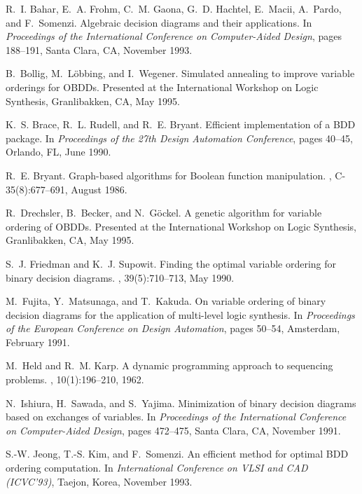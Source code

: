 \documentclass[11pt]{article}
\begin{document}
\begin{thebibliography}{10}

R.~I. Bahar, E.~A. Frohm, C.~M. Gaona, G.~D. Hachtel, E.~Macii, A.~Pardo, and
  F.~Somenzi.
\newblock Algebraic decision diagrams and their applications.
\newblock In {\em Proceedings of the International Conference on Computer-Aided
  Design}, pages 188--191, Santa Clara, CA, November 1993.

B.~Bollig, M.~L\"obbing, and I.~Wegener.
\newblock Simulated annealing to improve variable orderings for {OBDDs}.
\newblock Presented at the International Workshop on Logic Synthesis,
  Granlibakken, CA, May 1995.

K.~S. Brace, R.~L. Rudell, and R.~E. Bryant.
\newblock Efficient implementation of a {BDD} package.
\newblock In {\em Proceedings of the 27th Design Automation Conference}, pages
  40--45, Orlando, FL, June 1990.

R.~E. Bryant.
\newblock Graph-based algorithms for {Boolean} function manipulation.
, C-35(8):677--691, August 1986.

R.~Drechsler, B.~Becker, and N.~G\"ockel.
\newblock A genetic algorithm for variable ordering of {OBDDs}.
\newblock Presented at the International Workshop on Logic Synthesis,
  Granlibakken, CA, May 1995.

S.~J. Friedman and K.~J. Supowit.
\newblock Finding the optimal variable ordering for binary decision diagrams.
, 39(5):710--713, May 1990.

M.~Fujita, Y.~Matsunaga, and T.~Kakuda.
\newblock On variable ordering of binary decision diagrams for the application
  of multi-level logic synthesis.
\newblock In {\em Proceedings of the European Conference on Design Automation},
  pages 50--54, Amsterdam, February 1991.

M.~Held and R.~M. Karp.
\newblock A dynamic programming approach to sequencing problems.
, 10(1):196--210, 1962.

N.~Ishiura, H.~Sawada, and S.~Yajima.
\newblock Minimization of binary decision diagrams based on exchanges of
  variables.
\newblock In {\em Proceedings of the International Conference on Computer-Aided
  Design}, pages 472--475, Santa Clara, CA, November 1991.

S.-W. Jeong, T.-S. Kim, and F.~Somenzi.
\newblock An efficient method for optimal {BDD} ordering computation.
\newblock In {\em International Conference on VLSI and CAD (ICVC'93)}, Taejon,
  Korea, November 1993.


\end{thebibliography}
\end{document}
